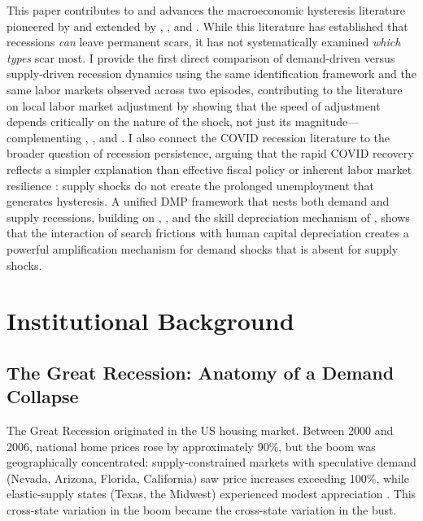\documentclass[12pt]{article}
\begin{document}
This paper contributes to and advances the macroeconomic hysteresis literature pioneered by \citet{blanchard1986hysteresis} and extended by \citet{cerra2008growth}, \citet{jorda2013sovereigns}, and \citet{cerra2023hysteresis}. While this literature has established that recessions \textit{can} leave permanent scars, it has not systematically examined \textit{which types} scar most. I provide the first direct comparison of demand-driven versus supply-driven recession dynamics using the same identification framework and the same labor markets observed across two episodes, contributing to the literature on local labor market adjustment \citep{blanchard1992regional, autor2013china, notowidigdo2020incidence, amior2021workers, beraja2019geography} by showing that the speed of adjustment depends critically on the nature of the shock, not just its magnitude---complementing \citet{hershbein2018recessions}, \citet{dao2017regional}, and \citet{foote2021recessions}. I also connect the COVID recession literature \citep{chetty2020real, cajner2020us, forsythe2022labor} to the broader question of recession persistence, arguing that the rapid COVID recovery reflects a simpler explanation than effective fiscal policy \citep{autor2022paycheck} or inherent labor market resilience \citep{hall2021labor}: supply shocks do not create the prolonged unemployment that generates hysteresis. A unified DMP framework that nests both demand and supply recessions, building on \citet{shimer2005cyclical}, \citet{hall2005employment}, and the skill depreciation mechanism of \citet{pissarides1992loss}, shows that the interaction of search frictions with human capital depreciation creates a powerful amplification mechanism for demand shocks that is absent for supply shocks.


\section{Institutional Background}
\label{sec:background}

\subsection{The Great Recession: Anatomy of a Demand Collapse}

The Great Recession originated in the US housing market. Between 2000 and 2006, national home prices rose by approximately 90\%, but the boom was geographically concentrated: supply-constrained markets with speculative demand (Nevada, Arizona, Florida, California) saw price increases exceeding 100\%, while elastic-supply states (Texas, the Midwest) experienced modest appreciation \citep{mian2013household, glaeser2017housing, saiz2010geographic}. This cross-state variation in the boom became the cross-state variation in the bust.
\end{document}
